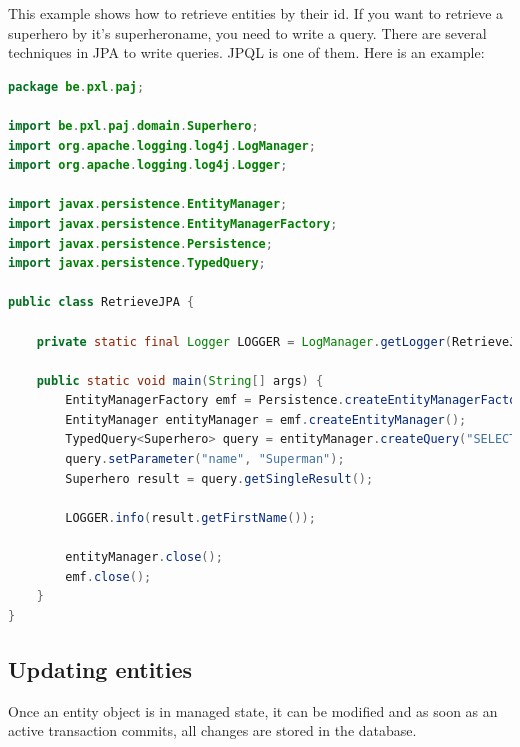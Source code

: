 This example shows how to retrieve entities by their id.  If you want to retrieve a superhero by it's superheroname, you need to write a query. There are several techniques in JPA to write queries. JPQL is one of them. Here is an example:

\begin{lstlisting}[frame=single,language=java]
package be.pxl.paj;

import be.pxl.paj.domain.Superhero;
import org.apache.logging.log4j.LogManager;
import org.apache.logging.log4j.Logger;

import javax.persistence.EntityManager;
import javax.persistence.EntityManagerFactory;
import javax.persistence.Persistence;
import javax.persistence.TypedQuery;

public class RetrieveJPA {

	private static final Logger LOGGER = LogManager.getLogger(RetrieveJPA.class);

	public static void main(String[] args) {
		EntityManagerFactory emf = Persistence.createEntityManagerFactory("musicdb_pu");
		EntityManager entityManager = emf.createEntityManager();
		TypedQuery<Superhero> query = entityManager.createQuery("SELECT s FROM Superhero s WHERE s.superheroName = :name", Superhero.class);;
		query.setParameter("name", "Superman");
		Superhero result = query.getSingleResult();

		LOGGER.info(result.getFirstName());

		entityManager.close();
		emf.close();
	}
}
\end{lstlisting}



\subsection{Updating entities}


Once an entity object is in managed state,  it can be modified and as soon as an active transaction commits, all changes are stored in the database.

